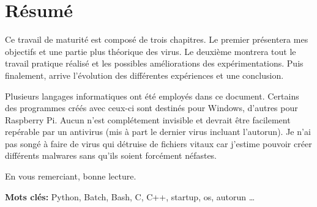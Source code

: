 \section*{Résumé}

\vspace{1cm}
Ce travail de maturité est composé de trois chapitres. Le premier présentera mes objectifs et une partie plus théorique des virus. Le deuxième montrera tout le travail pratique réalisé et les possibles améliorations des expérimentations. Puis finalement, arrive l'évolution des différentes expériences et une conclusion. 

\medskip

Plusieurs langages informatiques ont été employés dans ce document. Certains des programmes créés avec ceux-ci sont destinés pour Windows, d'autres pour Raspberry Pi. Aucun n'est complétement invisible et devrait être facilement repérable par un antivirus (mis à part le dernier virus incluant l'autorun). Je n'ai pas songé à faire de virus qui détruise de fichiers vitaux car j'estime pouvoir créer différents malwares sans qu'ils soient forcément néfastes.

\medskip

En vous remerciant, bonne lecture. 

\vspace*{1cm}
\textbf{Mots clés:} Python, Batch, Bash, C, C++, startup, os, autorun \dots